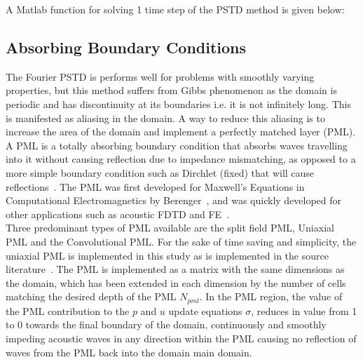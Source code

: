 A Matlab function for solving 1 time step of the PSTD method is given below:\\

%

\subsection{Absorbing Boundary Conditions}
The Fourier PSTD is performs well for problems with smoothly varying properties, but this method suffers from Gibbs phenomenon as the domain is periodic and has discontinuity at its boundaries i.e. it is not infinitely long. This is manifested as aliasing in the domain. A way to reduce this aliasing is to increase the area of the domain and implement a perfectly matched layer (PML). A PML is a totally absorbing boundary condition that absorbs waves travelling into it without causing reflection due to impedance mismatching, as opposed to a more simple boundary condition such as Dirchlet (fixed) that will cause reflections~\cite{Rumpf2012a}. The PML was first developed for Maxwell's Equations in Computational Electromagnetics by Berenger~\cite{Berenger1994}, and was quickly developed for other applications such as acoustic FDTD and FE~\cite{Liu1997}.\\

Three predominant types of PML available are the split field PML, Uniaxial PML and the Convolutional PML. For the sake of time saving and simplicity, the uniaxial PML is implemented in this study as is implemented in the source literature~\cite{Angus2010}. The PML is implemented as a matrix with the same dimensions as the domain, which has been extended in each dimension by the number of cells matching the desired depth of the PML $N_{pml}$. In the PML region, the value of the PML contribution to the $p$ and $u$ update equations $\sigma$, reduces in value from 1 to 0 towards the final boundary of the domain, continuously and smoothly impeding acoustic waves in any direction within the PML causing no reflection of waves from the PML back into the domain main domain.\\
 
